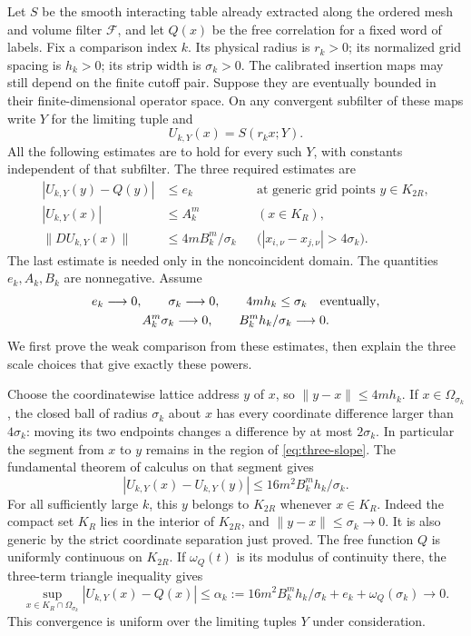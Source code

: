 Let $S$ be the smooth interacting table already extracted along the ordered
mesh and volume filter $\mathcal F$, and let $Q(x)$ be the free correlation
for a fixed word of labels. Fix a comparison index $k$. Its physical radius
is $r_k>0$; its normalized grid spacing is $h_k>0$; its strip width is
$\sigma_k>0$. The calibrated insertion maps may still depend on the finite
cutoff pair. Suppose they are eventually bounded in their finite-dimensional
operator space. On any convergent subfilter of these maps write $Y$ for the
limiting tuple and
\[
                 U_{k,Y}(x)=S(r_kx;Y).
\]
All the following estimates are to hold for every such $Y$, with constants
independent of that subfilter. The three required estimates are
\begin{align}
 |U_{k,Y}(y)-Q(y)|&\le e_k
 &&\text{at generic grid points }y\in K_{2R},\label{eq:three-grid}\\
 |U_{k,Y}(x)|&\le A_k^m
 &&(x\in K_R),\label{eq:three-bulk}\\
 \|D U_{k,Y}(x)\|&\le 4m B_k^m/\sigma_k
 &&\bigl(|x_{i,\nu}-x_{j,\nu}|>4\sigma_k\bigr).
 \label{eq:three-slope}
\end{align}
The last estimate is needed only in the noncoincident domain. The quantities
$e_k,A_k,B_k$ are nonnegative. Assume
\begin{gather}
 e_k\longrightarrow0,\qquad \sigma_k\longrightarrow0,\qquad
                 4m h_k\le\sigma_k\quad\hbox{eventually},\label{eq:three-room}\\
 A_k^m\sigma_k\longrightarrow0,\qquad
                  B_k^m h_k/\sigma_k\longrightarrow0.
                  \label{eq:three-balances}
\end{gather}
We first prove the weak comparison from these estimates, then explain the
three scale choices that give exactly these powers.

Choose the coordinatewise lattice address $y$ of $x$, so
$\|y-x\|\le4m h_k$. If $x\in\Omega_{\sigma_k}$, the closed ball
of radius $\sigma_k$ about $x$ has every coordinate difference larger
than $4\sigma_k$: moving its two endpoints changes a difference by at
most $2\sigma_k$. In particular the segment from $x$ to $y$ remains
in the region of \eqref{eq:three-slope}. The fundamental theorem of
calculus on that segment gives
\[
 |U_{k,Y}(x)-U_{k,Y}(y)|
          \le16m^2 B_k^m h_k/\sigma_k.
\]
For all sufficiently large $k$, this $y$ belongs to $K_{2R}$ whenever
$x\in K_R$. Indeed the compact set $K_R$ lies in the interior of
$K_{2R}$, and $\|y-x\|\le\sigma_k\to0$. It is also generic by the
strict coordinate separation just proved. The free function $Q$ is
uniformly continuous on $K_{2R}$. If $\omega_Q(t)$ is its modulus of
continuity there, the three-term triangle inequality gives
\begin{equation}\label{eq:three-clear}
 \sup_{x\in K_R\cap\Omega_{\sigma_k}}
 |U_{k,Y}(x)-Q(x)|
 \le\alpha_k:=16m^2B_k^m h_k/\sigma_k+e_k+\omega_Q(\sigma_k)
 \longrightarrow0.
\end{equation}
This convergence is uniform over the limiting tuples $Y$ under consideration.

